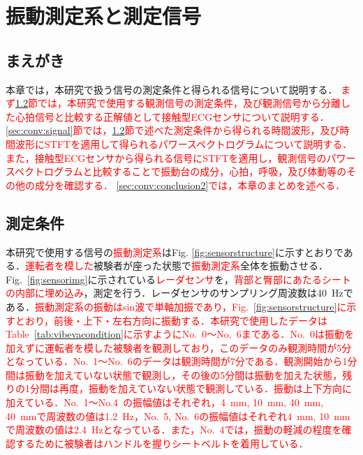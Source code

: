 \chapter{振動測定系と測定信号}
\label{chap:measurementstructsig}

\section{まえがき}
本章では，本研究で扱う信号の測定条件と得られる信号について説明する．
\textcolor{red}{まず\ref{sec:conv:measurementcondition}節では，本研究で使用する観測信号の測定条件，及び観測信号から分離した心拍信号と比較する正解値として接触型ECGセンサについて説明する．
\ref{sec:conv:signal}節では，\ref{sec:conv:measurementcondition}節で述べた測定条件から得られる時間波形，及び時間波形にSTFTを適用して得られるパワースペクトログラムについて説明する．また，接触型ECGセンサから得られる信号にSTFTを適用し，観測信号のパワースペクトログラムと比較することで振動台の成分，心拍，呼吸，及び体動等のその他の成分を確認する．
\ref{sec:conv:conclusion2}では，本章のまとめを述べる．}

\section{測定条件}
\label{sec:conv:measurementcondition}
本研究で使用する信号の\textcolor{red}{振動測定系}はFig. \ref{fig:sensorstructure}に示すとおりである．\textcolor{red}{運転者を模した}被験者が座った状態で\textcolor{red}{振動測定系}全体を振動させる．Fig.~\ref{fig:sensorimg}に示されている\textcolor{red}{レーダセンサ}を，\textcolor{red}{背部と臀部にあたるシートの内部に埋め込み}，測定を行う．レーダセンサのサンプリング周波数は40~Hzである．\textcolor{red}{振動測定系の振動はsin波で単軸加振であり，Fig.~\ref{fig:sensorstructure}に示すとおり，前後・上下・左右方向に振動する．本研究で使用したデータはTable~\ref{tab:vibevacondition}に示すようにNo.~0～No.~6まである．No.~0は振動を加えずに運転者を模した被験者を観測しており，このデータのみ観測時間が5分となっている．No.~1～No.~6のデータは観測時間が7分である．観測開始から1分間は振動を加えていない状態で観測し，その後の5分間は振動を加えた状態，残りの1分間は再度，振動を加えていない状態で観測している．振動は上下方向に加えている．No.~1～No.4~の振幅値はそれぞれ，4~mm, 10~mm, 40~mm, 40~mmで周波数の値は1.2~Hz，No.~5, No.~6の振幅値はそれぞれ4~mm, 10~mmで周波数の値は2.4~Hzとなっている．また，No.~4では，振動の軽減の程度を確認するために被験者はハンドルを握りシートベルトを着用している．}

